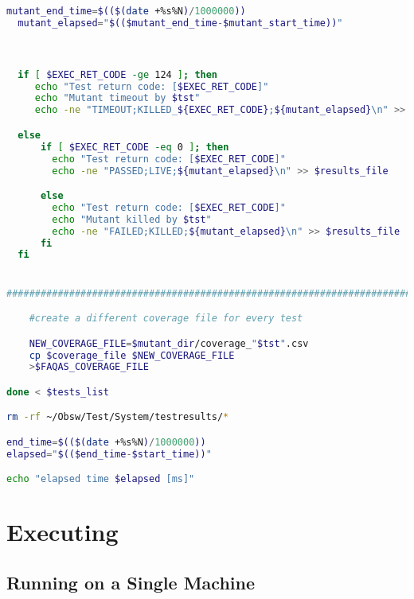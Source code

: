\begin{lstlisting}[label={lst:run_tests},language=bash]
  mutant_end_time=$(($(date +%s%N)/1000000))
  mutant_elapsed="$(($mutant_end_time-$mutant_start_time))"



  if [ $EXEC_RET_CODE -ge 124 ]; then
     echo "Test return code: [$EXEC_RET_CODE]"
     echo "Mutant timeout by $tst"
     echo -ne "TIMEOUT;KILLED_${EXEC_RET_CODE};${mutant_elapsed}\n" >> $results_file

  else
      if [ $EXEC_RET_CODE -eq 0 ]; then
        echo "Test return code: [$EXEC_RET_CODE]"
        echo -ne "PASSED;LIVE;${mutant_elapsed}\n" >> $results_file

      else
        echo "Test return code: [$EXEC_RET_CODE]"
        echo "Mutant killed by $tst"
        echo -ne "FAILED;KILLED;${mutant_elapsed}\n" >> $results_file
      fi
  fi


###############################################################################

	#create a different coverage file for every test

	NEW_COVERAGE_FILE=$mutant_dir/coverage_"$tst".csv
	cp $coverage_file $NEW_COVERAGE_FILE
	>$FAQAS_COVERAGE_FILE

done < $tests_list

rm -rf ~/Obsw/Test/System/testresults/*

end_time=$(($(date +%s%N)/1000000))
elapsed="$(($end_time-$start_time))"

echo "elapsed time $elapsed [ms]"


\end{lstlisting}

\section{Executing \DAMA}

\subsection{Running \DAMA on a Single Machine}
\label{sec:dama_singlelaunch}

%

